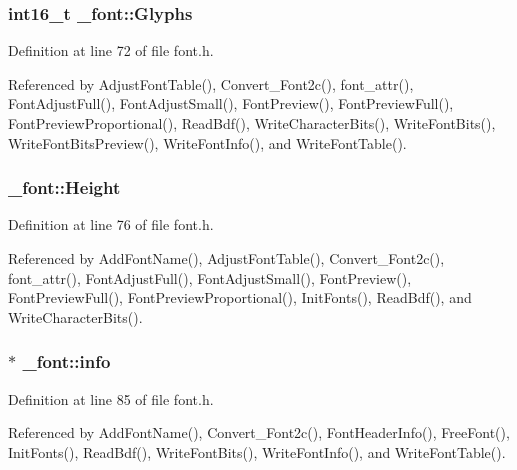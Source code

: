 \hypertarget{struct__font_a1e89c06fc11a730eb602522dc8953491}{
\subsubsection[{Glyphs}]{\setlength{\rightskip}{0pt plus 5cm}int16\-\_\-t \-\_\-font\-::\-Glyphs}}\label{struct__font_a1e89c06fc11a730eb602522dc8953491}


Definition at line 72 of file font.\-h.



Referenced by Adjust\-Font\-Table(), Convert\-\_\-\-Font2c(), font\-\_\-attr(), Font\-Adjust\-Full(), Font\-Adjust\-Small(), Font\-Preview(), Font\-Preview\-Full(), Font\-Preview\-Proportional(), Read\-Bdf(), Write\-Character\-Bits(), Write\-Font\-Bits(), Write\-Font\-Bits\-Preview(), Write\-Font\-Info(), and Write\-Font\-Table().

\hypertarget{struct__font_a5888921d1a78bf917351a275e2033467}{
\subsubsection[{Height}]{ \-\_\-font\-::\-Height}}\label{struct__font_a5888921d1a78bf917351a275e2033467}


Definition at line 76 of file font.\-h.



Referenced by Add\-Font\-Name(), Adjust\-Font\-Table(), Convert\-\_\-\-Font2c(), font\-\_\-attr(), Font\-Adjust\-Full(), Font\-Adjust\-Small(), Font\-Preview(), Font\-Preview\-Full(), Font\-Preview\-Proportional(), Init\-Fonts(), Read\-Bdf(), and Write\-Character\-Bits().

\hypertarget{struct__font_abf134e8a44e707d3b4e83ab76c952ed9}{
\subsubsection[{info}]{ $\ast$ \-\_\-font\-::info}}\label{struct__font_abf134e8a44e707d3b4e83ab76c952ed9}


Definition at line 85 of file font.\-h.



Referenced by Add\-Font\-Name(), Convert\-\_\-\-Font2c(), Font\-Header\-Info(), Free\-Font(), Init\-Fonts(), Read\-Bdf(), Write\-Font\-Bits(), Write\-Font\-Info(), and Write\-Font\-Table().

